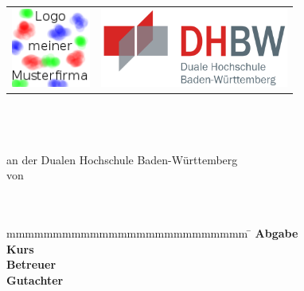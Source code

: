 \begin{titlepage}
	\begin{longtable}{p{} p{}}
	  {\includegraphics[height=2.6cm]{images/logo.png}} & 
	  {\includegraphics[height=2.6cm]{images/dhbw.png}}
	\end{longtable}
	\enlargethispage{25mm}
	\begin{center}
	  \vspace*{18mm}	{\LARGE\bf \titel }\\
	  \vspace*{18mm}	{\large\bf \arbeit}\\
	  \vspace*{18mm}	\studiengang\\
	  \vspace*{3mm} 	an der Dualen Hochschule Baden-Württemberg \dhbw\\
	  \vspace*{18mm}	von\\
	  \vspace*{3mm} 	{\large\bf \autor}\\
	  \vspace*{18mm}	\datumAbgabe\\
	\end{center}
	\vfill
	\begin{spacing}{1.2}
	\begin{tabbing}
		mmmmmmmmmmmmmmmmmmmmmmmmmm     \= \kill
		\textbf{Abgabe}  \>  \zeitraum\\
		\textbf{Kurs}  				   \>  \kurs\\
		\textbf{Betreuer}              \>  \betreuer\\
		\textbf{Gutachter}             \>  \gutachter
	\end{tabbing}
	\end{spacing}
\end{titlepage}
